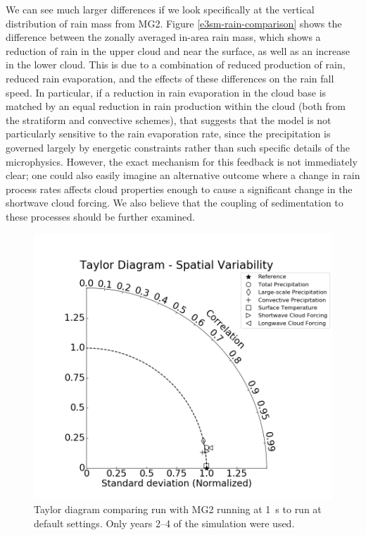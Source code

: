 \documentclass [11pt, proquest] {uwthesis}[2020/02/24]
\begin{document}
We can see much larger differences if we look specifically at the vertical distribution of rain mass from MG2. Figure \ref{e3sm-rain-comparison} shows the difference between the zonally averaged in-area rain mass, which shows a reduction of rain in the upper cloud and near the surface, as well as an increase in the lower cloud. This is due to a combination of reduced production of rain, reduced rain evaporation, and the effects of these differences on the rain fall speed. In particular, if a reduction in rain evaporation in the cloud base is matched by an equal reduction in rain production within the cloud (both from the stratiform and convective schemes), that suggests that the model is not particularly sensitive to the rain evaporation rate, since the precipitation is governed largely by energetic constraints rather than such specific details of the microphysics. However, the exact mechanism for this feedback is not immediately clear; one could also easily imagine an alternative outcome where a change in rain process rates affects cloud properties enough to cause a significant change in the shortwave cloud forcing. We also believe that the coupling of sedimentation to these processes should be further examined.

\begin{figure}[htbp]
  \includegraphics[width=6.5in]{./ANN_metrics_taylor_diag.png}
  \caption[Taylor diagram comparing an EAMv1 simulation with reduced MG2 substep to a control run]{Taylor diagram comparing run with MG2 running at \SI{1}{\second} to run at default settings. Only years \numrange{2}{4} of the simulation were used.}
  \label{e3sm-taylor}
\end{figure}
\end{document}
